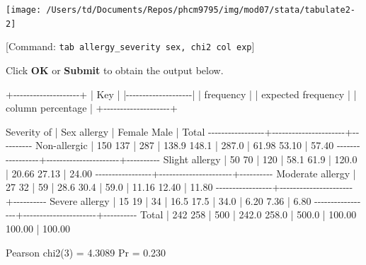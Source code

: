 \documentclass[
]{memoir}
\newenvironment{Shaded}{\begin{snugshade}}{\end{snugshade}}
\newcommand{\NormalTok}[1]{#1}
\begin{document}
\texttt{[image: /Users/td/Documents/Repos/phcm9795/img/mod07/stata/tabulate2-2]}

{[}Command: \texttt{tab\ allergy\_severity\ sex,\ chi2\ col\ exp}{]}

Click \textbf{OK} or \textbf{Submit} to obtain the output below.

\begin{Shaded}
\begin{Highlighting}[]
\NormalTok{+{-}{-}{-}{-}{-}{-}{-}{-}{-}{-}{-}{-}{-}{-}{-}{-}{-}{-}{-}{-}+}
\NormalTok{| Key                |}
\NormalTok{|{-}{-}{-}{-}{-}{-}{-}{-}{-}{-}{-}{-}{-}{-}{-}{-}{-}{-}{-}{-}|}
\NormalTok{|     frequency      |}
\NormalTok{| expected frequency |}
\NormalTok{| column percentage  |}
\NormalTok{+{-}{-}{-}{-}{-}{-}{-}{-}{-}{-}{-}{-}{-}{-}{-}{-}{-}{-}{-}{-}+}

\NormalTok{     Severity of |          Sex}
\NormalTok{         allergy |    Female       Male |     Total}
\NormalTok{{-}{-}{-}{-}{-}{-}{-}{-}{-}{-}{-}{-}{-}{-}{-}{-}{-}+{-}{-}{-}{-}{-}{-}{-}{-}{-}{-}{-}{-}{-}{-}{-}{-}{-}{-}{-}{-}{-}{-}+{-}{-}{-}{-}{-}{-}{-}{-}{-}{-}}
\NormalTok{    Non{-}allergic |       150        137 |       287 }
\NormalTok{                 |     138.9      148.1 |     287.0 }
\NormalTok{                 |     61.98      53.10 |     57.40 }
\NormalTok{{-}{-}{-}{-}{-}{-}{-}{-}{-}{-}{-}{-}{-}{-}{-}{-}{-}+{-}{-}{-}{-}{-}{-}{-}{-}{-}{-}{-}{-}{-}{-}{-}{-}{-}{-}{-}{-}{-}{-}+{-}{-}{-}{-}{-}{-}{-}{-}{-}{-}}
\NormalTok{  Slight allergy |        50         70 |       120 }
\NormalTok{                 |      58.1       61.9 |     120.0 }
\NormalTok{                 |     20.66      27.13 |     24.00 }
\NormalTok{{-}{-}{-}{-}{-}{-}{-}{-}{-}{-}{-}{-}{-}{-}{-}{-}{-}+{-}{-}{-}{-}{-}{-}{-}{-}{-}{-}{-}{-}{-}{-}{-}{-}{-}{-}{-}{-}{-}{-}+{-}{-}{-}{-}{-}{-}{-}{-}{-}{-}}
\NormalTok{Moderate allergy |        27         32 |        59 }
\NormalTok{                 |      28.6       30.4 |      59.0 }
\NormalTok{                 |     11.16      12.40 |     11.80 }
\NormalTok{{-}{-}{-}{-}{-}{-}{-}{-}{-}{-}{-}{-}{-}{-}{-}{-}{-}+{-}{-}{-}{-}{-}{-}{-}{-}{-}{-}{-}{-}{-}{-}{-}{-}{-}{-}{-}{-}{-}{-}+{-}{-}{-}{-}{-}{-}{-}{-}{-}{-}}
\NormalTok{  Severe allergy |        15         19 |        34 }
\NormalTok{                 |      16.5       17.5 |      34.0 }
\NormalTok{                 |      6.20       7.36 |      6.80 }
\NormalTok{{-}{-}{-}{-}{-}{-}{-}{-}{-}{-}{-}{-}{-}{-}{-}{-}{-}+{-}{-}{-}{-}{-}{-}{-}{-}{-}{-}{-}{-}{-}{-}{-}{-}{-}{-}{-}{-}{-}{-}+{-}{-}{-}{-}{-}{-}{-}{-}{-}{-}}
\NormalTok{           Total |       242        258 |       500 }
\NormalTok{                 |     242.0      258.0 |     500.0 }
\NormalTok{                 |    100.00     100.00 |    100.00 }

\NormalTok{          Pearson chi2(3) =   4.3089   Pr = 0.230}
\end{Highlighting}
\end{Shaded}
\end{document}
